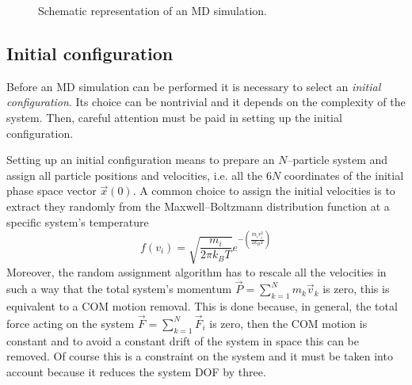 \begin{figure}[!ht]
\centering
{}
\caption{Schematic representation of an \acs{MD} simulation.}
\label{fig:MDscheme}
\end{figure}

\subsection{Initial configuration}
Before an \ac{MD} simulation can be performed it is necessary to select an \textit{initial configuration}. Its 
choice can be nontrivial and it depends on the complexity of the system. Then, careful attention must be paid in 
setting up the initial configuration.

Setting up an initial configuration means to prepare an $N$--particle system and assign all particle positions 
and velocities, i.e. all the $6N$ coordinates of the initial phase space vector $\vec x(0)$. A common choice to 
assign the initial velocities is to extract they randomly from the Maxwell--Boltzmann distribution function at a 
specific system's temperature
\begin{equation*}
	f(v_i) = \sqrt{\frac{m_i}{2\pi k_B T}}e^{-\left ( \frac{m_iv_i^2}{2k_B T}\right )}
\end{equation*}
Moreover, the random assignment algorithm has to rescale all the velocities in such a way that the total system's 
momentum $\vec P = \sum_{k=1}^N m_k\vec v_k$ is zero, this is equivalent to a \ac{COM} motion removal. This is 
done because, in general, the total force acting on the system $\vec F = \sum_{k=1}^N \vec F_i$ is zero, then the 
\ac{COM} motion is constant and to avoid a constant drift of the system in space this can be removed. Of course 
this is a constraint on the system and it must be taken into account because it reduces the system \ac{DOF} by three.


